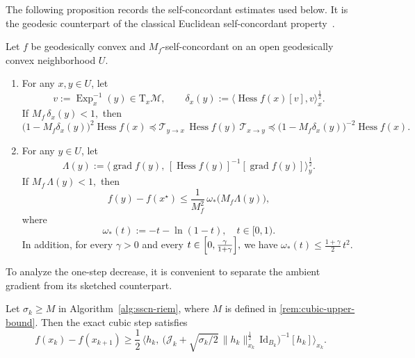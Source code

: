 \documentclass[final,onefignum,onetabnum]{siamart250211}
\DeclareMathOperator{\grad}{grad}
\newcommand{\Hess}{\operatorname{Hess}}
\DeclareMathOperator{\Exp}{Exp}
\begin{document}
The following proposition records the self-concordant estimates used below. It is the geodesic counterpart of the classical Euclidean self-concordant property~\cite[{Theorem 5.1.7, Theorem 5.1.12}]{nesterov2018lectures}.
\begin{proposition}
\label{prop:self-concordant}
Let $f$ be geodesically convex and $M_f$-self-concordant on an open geodesically convex neighborhood $U$.
\begin{enumerate}
\item[1.] For any $x,y\in U$, let
\[
v:=\Exp_x^{-1}(y)\in \mathrm{T}_x\mathcal{M},
\qquad
\delta_x(y):=\big\langle \Hess f(x)[v],v\big\rangle_x^{\frac{1}{2}}.
\]
If
$
M_f\,\delta_x(y)<1,
$
then
\[
\bigl(1-M_f\delta_x(y)\bigr)^2 \Hess f(x)
\preceq
\mathcal T_{y\to x}\,\Hess f(y)\,\mathcal T_{x\to y}
\preceq
\bigl(1-M_f\delta_x(y)\bigr)^{-2}\Hess f(x).
\]

\item[2.] For any $y\in U$, let
\[
\Lambda(y):=
\big\langle
\grad f(y),\,
[\Hess f(y)]^{-1}[\grad f(y)]
\big\rangle_y^{\frac{1}{2}}.
\]
If
$
M_f\,\Lambda(y)<1,
$
then
\[
f(y)-f(x^\star)\le \frac{1}{M_f^2}\,\omega_*\bigl(M_f\Lambda(y)\bigr),
\]
where
\[
\omega_*(t):=-t-\ln(1-t),
\quad t\in[0,1).
\]
In addition, for every $\gamma>0$ and every
$
t\in\Bigl[0,\frac{\gamma}{1+\gamma}\Bigr],
$
we have
$
\omega_*(t)\le \frac{1+\gamma}{2}\,t^2.
$
\end{enumerate}
\end{proposition}

To analyze the one-step decrease, it is convenient to separate the ambient gradient from its sketched counterpart.
\begin{lemma}
\label{lem:manifold-descent-lemma}
Let $\sigma_k\ge M$ in Algorithm~\ref{alg:sscn-riem}, where $M$ is defined in \cref{rem:cubic-upper-bound}. Then the exact cubic step satisfies
\[
f(x_k)-f(x_{k+1})
\ge
\frac{1}{2}\,
\Big\langle
h_k,\
\bigl(\mathcal J_k+\sqrt{\sigma_k/2}\,\|h_k\|_{x_k}^{\frac{1}{2}}\,\mathrm{Id}_{B_k}\bigr)^{-1}[h_k]
\Big\rangle_{x_k}.
\]
\end{lemma}
\end{document}
